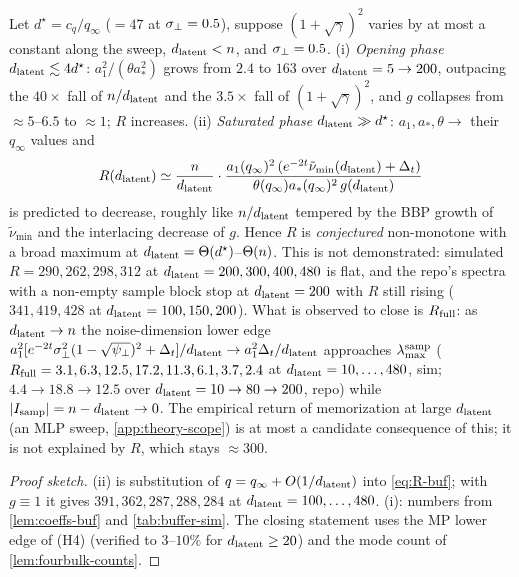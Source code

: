 \begin{proposition}\label{prop:phases-buf}
Let $d^\star=c_q/q_\infty$ ($=47$ at $\sigma_{\perp}=0.5$), suppose $(1+\sqrt\gamma)^2$ varies by at most a constant along the sweep, $d_{\mathrm{latent}}<n$, and $\sigma_{\perp}=0.5$.
(i) \emph{Opening phase} $d_{\mathrm{latent}}\lesssim4d^\star$: $a_1^2/(\theta a_*^2)$ grows from $2.4$ to $163$ over $d_{\mathrm{latent}}=5\to200$, outpacing the $40\times$ fall of $n/d_{\mathrm{latent}}$ and the $3.5\times$ fall of $(1+\sqrt\gamma)^2$, and $g$ collapses from $\approx5$--$6.5$ to $\approx1$; $R$ increases.
(ii) \emph{Saturated phase} $d_{\mathrm{latent}}\gg d^\star$: $a_1,a_*,\theta\to$ their $q_\infty$ values and
\begin{equation}
R(d_{\mathrm{latent}})\simeq\frac{n}{d_{\mathrm{latent}}}\cdot\frac{a_1(q_\infty)^2\,(e^{-2t}\tilde\nu_{\min}(d_{\mathrm{latent}})+\Delta_t)}{\theta(q_\infty)a_*(q_\infty)^2\,g(d_{\mathrm{latent}})}
\label{eq:R-saturated-buf}
\end{equation}
is predicted to decrease, roughly like $n/d_{\mathrm{latent}}$ tempered by the BBP growth of $\tilde\nu_{\min}$ and the interlacing decrease of $g$. Hence $R$ is \emph{conjectured} non-monotone with a broad maximum at $d_{\mathrm{latent}}=\Theta(d^\star)$--$\Theta(n)$. This is not demonstrated: simulated $R=290,262,298,312$ at $d_{\mathrm{latent}}=200,300,400,480$ is flat, and the repo's spectra with a non-empty sample block stop at $d_{\mathrm{latent}}=200$ with $R$ still rising ($341,419,428$ at $d_{\mathrm{latent}}=100,150,200$). What is observed to close is $R_{\rm full}$: as $d_{\mathrm{latent}}\to n$ the noise-dimension lower edge $a_1^2[e^{-2t}\sigma_{\perp}^2(1-\sqrt{\psi_\perp})^2+\Delta_t]/d_{\mathrm{latent}}\to a_1^2\Delta_t/d_{\mathrm{latent}}$ approaches $\lambda^{\rm samp}_{\max}$ ($R_{\rm full}=3.1,6.3,12.5,17.2,11.3,6.1,3.7,2.4$ at $d_{\mathrm{latent}}=10,\dots,480$, sim; $4.4\to18.8\to12.5$ over $d_{\mathrm{latent}}=10\to80\to200$, repo) while $|I_{\rm samp}|=n-d_{\mathrm{latent}}\to0$. The empirical return of memorization at large $d_{\mathrm{latent}}$ (an MLP sweep, \cref{app:theory-scope}) is at most a candidate consequence of this; it is not explained by $R$, which stays $\approx300$.
\end{proposition}
\begin{proof}[Proof sketch]
(ii) is substitution of $q=q_\infty+O(1/d_{\mathrm{latent}})$ into \eqref{eq:R-buf}; with $g\equiv1$ it gives $391,362,287,288,284$ at $d_{\mathrm{latent}}=100,\dots,480$. (i): numbers from \cref{lem:coeffs-buf} and \cref{tab:buffer-sim}. The closing statement uses the MP lower edge of (H4) (verified to $3$--$10\%$ for $d_{\mathrm{latent}}\ge20$) and the mode count of \cref{lem:fourbulk-counts}.
\end{proof}

